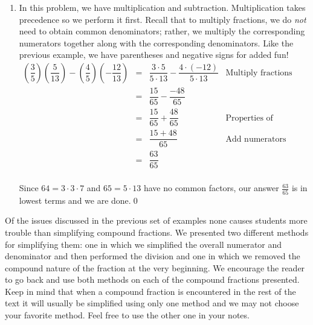 \documentclass{ximera}
\begin{document}
\begin{example}
\begin{enumerate}
\item  In this problem, we have multiplication and subtraction.  Multiplication takes precedence so we perform it first.  Recall that to multiply fractions, we do \textit{not} need to obtain common denominators;  rather, we multiply the corresponding numerators together along with the corresponding denominators.  Like the previous example, we have parentheses and negative signs for added fun!\[ \begin{array}{rclr}

\left(\dfrac{3}{5} \right) \left(\dfrac{5}{13} \right) - \left(\dfrac{4}{5}\right) \left( - \dfrac{12}{13}\right) & = & \dfrac{3 \cdot 5}{5 \cdot 13} - \dfrac{4\cdot (-12)}{5 \cdot 13} & \text{Multiply fractions}\\ [8pt]

& = & \dfrac{15}{65} - \dfrac{-48}{65} & \\[10pt]
& = & \dfrac{15}{65} + \dfrac{48}{65} & \text{Properties of Negatives}\\[10pt]
& = & \dfrac{15+48}{65}  & \text{Add numerators} \\ [10pt]
& = & \dfrac{63}{65}  & \\ \end{array} \]

Since $64 = 3 \cdot 3 \cdot 7$ and $65 = 5 \cdot 13$ have no common factors, our answer $\frac{63}{65}$ is in lowest terms and we are done.\qed

\end{enumerate}

\end{example} 

Of the issues discussed in the previous set of examples none causes students more trouble than simplifying compound fractions.  We presented two different methods for simplifying them:  one in which we simplified the overall numerator and denominator and then performed the division and one in which we removed the compound nature of the fraction at the very beginning.   We encourage the reader to go back and use both methods on each of the compound fractions presented.  Keep in mind that when a compound fraction is encountered in the rest of the text it will usually be simplified using only one method and we may not choose your favorite method.  Feel free to use the other one in your notes.

\smallskip
\end{document}
